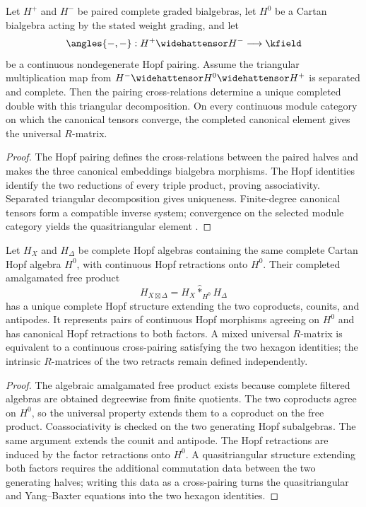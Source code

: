 \begin{theorem}
Let $H^+$ and $H^-$ be paired complete graded bialgebras, let $H^0$ be a Cartan bialgebra acting by the stated weight grading, and let
\[
 \angles{-,-}:H^+\widehattensor H^-\longrightarrow\kfield
\]
be a continuous nondegenerate Hopf pairing. Assume the triangular multiplication map from $H^-\widehattensor H^0\widehattensor H^+$ is separated and complete. Then the pairing cross-relations determine a unique completed double with this triangular decomposition. On every continuous module category on which the canonical tensors converge, the completed canonical element gives the universal $R$-matrix.
\end{theorem}
\begin{proof}
The Hopf pairing defines the cross-relations between the paired halves and makes the three canonical embeddings bialgebra morphisms. The Hopf identities identify the two reductions of every triple product, proving associativity. Separated triangular decomposition gives uniqueness. Finite-degree canonical tensors form a compatible inverse system; convergence on the selected module category yields the quasitriangular element \cite{DrinfeldDouble,EtingofSchiffmann}.
\end{proof}

\begin{theorem}
Let $H_X$ and $H_\Delta$ be complete Hopf algebras containing the same complete Cartan Hopf algebra $H^0$, with continuous Hopf retractions onto $H^0$.  Their completed amalgamated free product
\[
 H_{X\boxtimes\Delta}
 =H_X\widehat *_{H^0}H_\Delta
\]
has a unique complete Hopf structure extending the two coproducts, counits, and antipodes.  It represents pairs of continuous Hopf morphisms agreeing on $H^0$ and has canonical Hopf retractions to both factors.  A mixed universal $R$-matrix is equivalent to a continuous cross-pairing satisfying the two hexagon identities; the intrinsic $R$-matrices of the two retracts remain defined independently.
\end{theorem}
\begin{proof}
The algebraic amalgamated free product exists because complete filtered algebras are obtained degreewise from finite quotients.  The two coproducts agree on $H^0$, so the universal property extends them to a coproduct on the free product.  Coassociativity is checked on the two generating Hopf subalgebras.  The same argument extends the counit and antipode.  The Hopf retractions are induced by the factor retractions onto $H^0$.  A quasitriangular structure extending both factors requires the additional commutation data between the two generating halves; writing this data as a cross-pairing turns the quasitriangular and Yang--Baxter equations into the two hexagon identities.
\end{proof}

